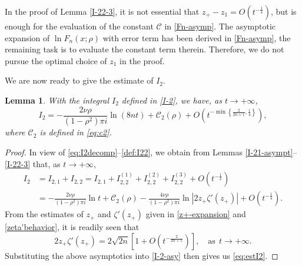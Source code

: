 \documentclass[11pt,a4paper]{article}
\newtheorem{lemma}[thm]{Lemma}
\numberwithin{equation}{section}
\begin{document}
In the proof of Lemma \ref{I-22-3}, it is not essential that $z_+-z_1=O(t^{-\frac{1}{4}})$, but is enough for the  evaluation of the constant $\mathcal{C}$ in \eqref{Fn-asymp}.  The asymptotic expansion of $\ln{F}_n(x;\rho)$ with error term has been derived in \eqref{Fn-asymp}, the remaining task is to evaluate the constant term  therein. Therefore, we do not pursue the optimal choice of $z_1$ in the proof.
 

We are now ready to give the estimate of $I_2$. 
\begin{lemma}\label{I-2-asympt}
With the integral $I_2$ defined in \eqref{I-2}, we have, as $t\to+\infty$,
\begin{equation}\label{eq:estI2}
I_2=-\frac{2\nu\rho}{(1-\rho^2)\pi i}\ln(8nt)
+\mathcal{C}_2(\rho)+O\left(t^{-\min\left\{\frac{2}{2n+1},\frac{1}{4}\right\}}\right),
\end{equation}
where $\mathcal{C}_2$ is defined in \eqref{eq:c2}.
\end{lemma}
\begin{proof}
In view of \eqref{eq:I2decomp}--\eqref{def:I22}, we obtain from Lemmas \ref{I-21-asympt}--\ref{I-22-3} that, as $t\to+\infty$,
\begin{align}\label{I-2-asy}
I_2&=I_{2,1}+I_{2,2}=I_{2,1}+I^{(1)}_{2,2}+I^{(2)}_{2,2}+I^{(3)}_{2,2}
+O\left(t^{-\frac{1}{2}}\right)\nonumber\\
&=-\frac{2\nu\rho}{(1-\rho^2)\pi i}\ln{t}+\mathcal{C}_2(\rho)
-\frac{4\nu\rho}{(1-\rho^2)\pi i}\ln\left|2z_+\zeta'(z_+)\right|
+O\left(t^{-\frac{1}{4}}\right).
\end{align}
From the estimates of $z_+$ and $\zeta'(z_+)$ given in \eqref{z+-expansion} and \eqref{zeta'behavior}, it is readily seen that
\begin{equation*}
2z_+\zeta'(z_+)=2\sqrt{2n}\left[1+O\left(t^{-\frac{2}{2n+1}}\right)\right],
\quad\mathrm{as}~~t\to+\infty.
\end{equation*}
Substituting the above asymptotics into \eqref{I-2-asy} then gives us \eqref{eq:estI2}.
\end{proof}
\end{document}
